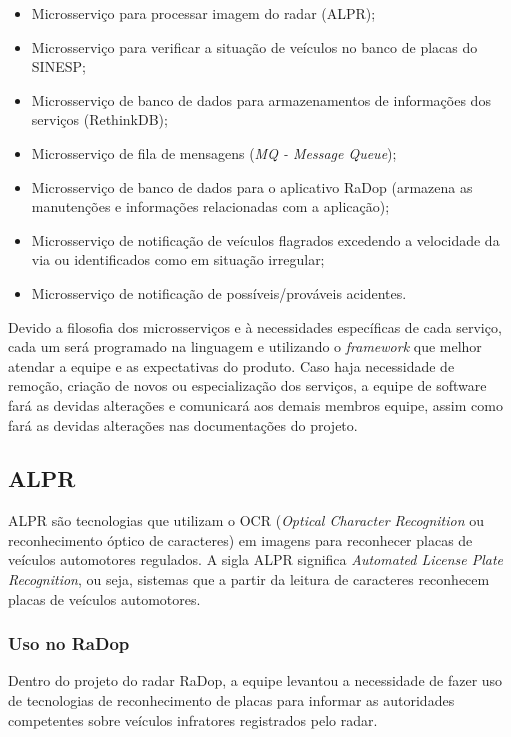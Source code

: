 \begin{itemize}
    \item Microsserviço para processar imagem do radar (ALPR);
    \item Microsserviço para verificar a situação de veículos no banco de placas do SINESP;
    \item Microsserviço de banco de dados para armazenamentos de informações dos serviços (RethinkDB);
    \item Microsserviço de fila de mensagens (\textit{MQ - Message Queue});
    \item Microsserviço de banco de dados para o aplicativo RaDop (armazena as manutenções e informações relacionadas com a aplicação);
    \item Microsserviço de notificação de veículos flagrados excedendo a velocidade da via ou identificados como em situação irregular;
    \item Microsserviço de notificação de possíveis/prováveis acidentes.
\end{itemize}

Devido a filosofia dos microsserviços e à necessidades específicas de cada serviço, cada um será programado na linguagem e utilizando o \textit{framework} que melhor atendar a equipe e as expectativas do produto.
Caso haja necessidade de remoção, criação de novos ou especialização dos serviços, a equipe de software fará as devidas alterações e comunicará aos demais membros equipe, assim como fará as devidas alterações nas documentações do projeto.

\subsection{ALPR}

ALPR são tecnologias que utilizam o OCR (\textit{Optical Character Recognition} ou reconhecimento óptico de caracteres) em imagens para reconhecer placas de veículos automotores regulados. A sigla ALPR significa \textit{Automated License Plate Recognition}, ou seja, sistemas que a partir da leitura de caracteres reconhecem placas de veículos automotores.

\subsubsection{Uso no RaDop}

Dentro do projeto do radar RaDop, a equipe levantou a necessidade de fazer uso de tecnologias de reconhecimento de placas para informar as autoridades competentes sobre veículos infratores registrados pelo radar.

